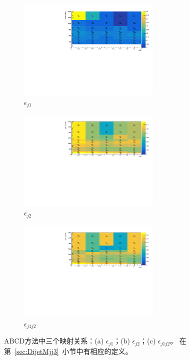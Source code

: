 \begin{figure}[!thbp]
  \begin{subfigure}{1\textwidth}
  \centering
  \includegraphics[width=0.75\textwidth]{figuresDijet/04-BackgroundEstimation/lead_map.pdf}
  \caption{$\epsilon_{j1}$}
  \end{subfigure}
  \begin{subfigure}{1\textwidth}
  \centering
  \includegraphics[width=0.75\textwidth]{figuresDijet/04-BackgroundEstimation/sublead_map.pdf}
  \caption{$\epsilon_{j2}$}
  \end{subfigure}
\newline 
  \begin{subfigure}{1\textwidth}
  \centering
  \includegraphics[width=0.75\textwidth]{figuresDijet/04-BackgroundEstimation/conditional_eff.pdf}
  \caption{$\epsilon_{j1j2}$}
  \end{subfigure}
  \caption{
  ABCD方法中三个映射关系：(a) $\epsilon_{j1}$；(b) $\epsilon_{j2}$；(c) $\epsilon_{j1j2}$。
  在第~\ref{sec:DijetMjj3}~小节中有相应的定义。
  }
\label{fig:maps}
\end{figure}


